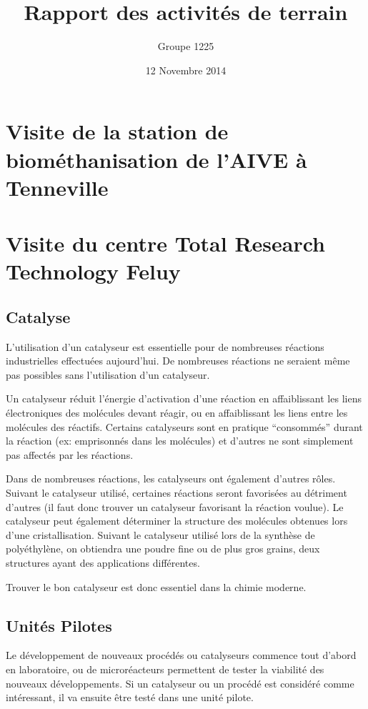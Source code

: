 \documentclass[a4paper, oneside, 12pt]{article}
\title{Rapport des activités de terrain}
\author{Groupe 1225}
\date{12 Novembre 2014}
\begin{document}
\maketitle

\section{Visite de la station de biométhanisation de l’AIVE
à Tenneville}

\section{Visite du centre Total Research Technology Feluy}

\subsection{Catalyse}
 
L'utilisation d'un catalyseur est essentielle pour de nombreuses réactions industrielles effectuées aujourd'hui. De nombreuses réactions ne seraient même pas possibles sans l'utilisation d'un catalyseur.
 
Un catalyseur réduit l'énergie d'activation d'une réaction en affaiblissant les liens électroniques des molécules devant réagir, ou en affaiblissant les liens entre les molécules des réactifs. Certains catalyseurs sont en pratique ``consommés'' durant la réaction (ex: emprisonnés dans les molécules) et d'autres ne sont simplement pas affectés par les réactions. 

Dans de nombreuses réactions, les catalyseurs ont également d'autres rôles. Suivant le catalyseur utilisé, certaines réactions seront favorisées au détriment d'autres (il faut donc trouver un catalyseur favorisant la réaction voulue). Le catalyseur peut également déterminer la structure des molécules obtenues lors d'une cristallisation. Suivant le catalyseur utilisé lors de la synthèse de polyéthylène, on obtiendra une poudre fine ou de plus gros grains, deux structures ayant des applications différentes.
 
Trouver le bon catalyseur est donc essentiel dans la chimie moderne.
 
\subsection{Unités Pilotes}
 
Le développement de nouveaux procédés ou catalyseurs commence tout d'abord en laboratoire, ou de microréacteurs permettent de tester la viabilité des nouveaux développements. Si un catalyseur ou un procédé est considéré comme intéressant, il va ensuite être testé dans une unité pilote. 
\end{document}
